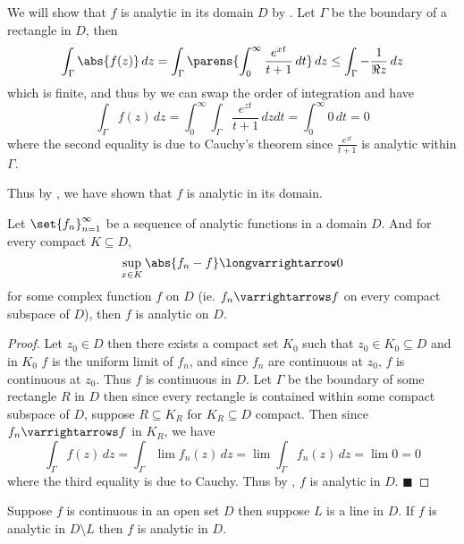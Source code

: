 \documentclass[10pt]{article}
\let\longto=\longvarrightarrow
\def\qed{\hskip1cm\hbox{}\hfill$\blacksquare$}
\begin{document}
We will show that $f$ is analytic in its domain $D$ by .
Let $\Gamma$ be the boundary of a rectangle in $D$, then
\[ \int_\Gamma\abs{f(z)}\,dz = \int_\Gamma\parens{\int_0^\infty\frac{e^{xt}}{t+1}\,dt}\,dz \leq \int_\Gamma-\frac1{\Re z}\,dz \]
which is finite, and thus by  we can swap the order of integration and have
\[ \int_\Gamma f(z)\,dz = \int_0^\infty\int_\Gamma\frac{e^{zt}}{t+1}\,dzdt = \int_0^\infty0\,dt = 0\]
where the second equality is due to Cauchy's theorem since $\frac{e^{zt}}{t+1}$ is analytic within $\Gamma$.

Thus by , we have shown that $f$ is analytic in its domain.

\begin{prop*}

    Let $\set{f_n}_{n=1}^\infty$ be a sequence of analytic functions in a domain $D$.
    And for every compact $K\subseteq D$, 
    \[ \sup_{x\in K}\abs{f_n-f}\longto 0 \]
    for some complex function $f$ on $D$ (ie. $f_n\varrightarrows f$ on every compact subspace of $D$), then $f$ is analytic on $D$.

\end{prop*}

\begin{proof}

    Let $z_0\in D$ then there exists a compact set $K_0$ such that $z_0\in K_0\subseteq D$ and in $K_0$ $f$ is the uniform limit of $f_n$, and since $f_n$ are continuous at $z_0$, $f$ is continuous at $z_0$.
    Thus $f$ is continuous in $D$.
    Let $\Gamma$ be the boundary of some rectangle $R$ in $D$ then since every rectangle is contained within some compact subspace of $D$, suppose $R\subseteq K_R$ for $K_R\subseteq D$ compact.
    Then since $f_n\varrightarrows f$ in $K_R$, we have
    \[ \int_\Gamma f(z)\,dz = \int_\Gamma \lim f_n(z)\,dz = \lim\int_\Gamma f_n(z)\,dz = \lim 0 = 0 \]
    where the third equality is due to Cauchy.
    Thus by , $f$ is analytic in $D$.
    \qed

\end{proof}

\begin{prop*}

    Suppose $f$ is continuous in an open set $D$ then suppose $L$ is a line in $D$.
    If $f$ is analytic in $D\setminus L$ then $f$ is analytic in $D$.

\end{prop*}
\end{document}
